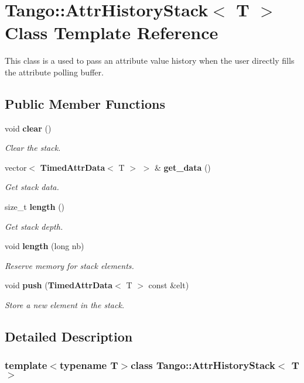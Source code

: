 \section{Tango\-:\-:Attr\-History\-Stack$<$ T $>$ Class Template Reference}
\label{classTango_1_1AttrHistoryStack}


This class is a used to pass an attribute value history when the user directly fills the attribute polling buffer.  


\subsection*{Public Member Functions}
\begin{DoxyCompactItemize}
\item 
void {\bf clear} ()
\begin{DoxyCompactList}\small\item\em Clear the stack. \end{DoxyCompactList}\item 
vector$<$ {\bf Timed\-Attr\-Data}$<$ T $>$ $>$ \& {\bf get\-\_\-data} ()
\begin{DoxyCompactList}\small\item\em Get stack data. \end{DoxyCompactList}\item 
size\-\_\-t {\bf length} ()
\begin{DoxyCompactList}\small\item\em Get stack depth. \end{DoxyCompactList}\item 
void {\bf length} (long nb)
\begin{DoxyCompactList}\small\item\em Reserve memory for stack elements. \end{DoxyCompactList}\item 
void {\bf push} ({\bf Timed\-Attr\-Data}$<$ T $>$ const \&elt)
\begin{DoxyCompactList}\small\item\em Store a new element in the stack. \end{DoxyCompactList}\end{DoxyCompactItemize}


\subsection{Detailed Description}
\subsubsection*{template$<$typename T$>$class Tango\-::\-Attr\-History\-Stack$<$ T $>$}

